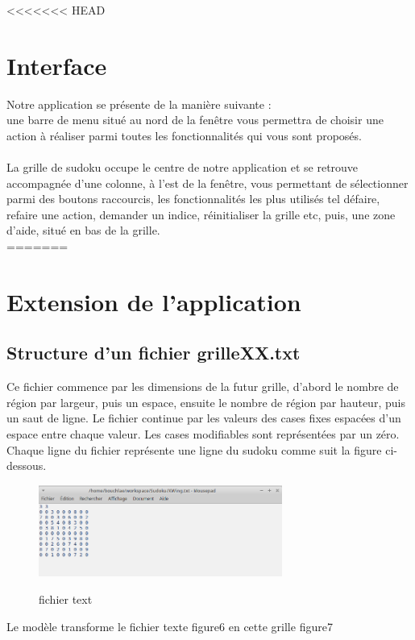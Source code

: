\newpage
<<<<<<< HEAD
\section{Interface}

Notre application se présente de la manière suivante :\\
une barre de menu situé au nord de la fenêtre vous permettra de choisir 
une action à réaliser parmi toutes les fonctionnalités qui vous sont proposés.\\
\\
La grille de sudoku occupe le centre de notre application et se retrouve accompagnée 
d'une colonne, à l'est de la fenêtre, vous permettant de sélectionner 
parmi des boutons raccourcis, les fonctionnalités les plus utilisés tel défaire, 
refaire une action, demander un indice, réinitialiser la grille etc, puis, 
une zone d'aide, situé en bas de la grille.\\
=======
\section{Extension de l’application}
\subsection{Structure d'un fichier grilleXX.txt}
Ce fichier commence  par les dimensions de la futur grille, d’abord le nombre de région par 
largeur, puis un espace, ensuite le nombre de région par hauteur, puis un saut de ligne.
Le fichier continue par les valeurs des cases fixes espacées d’un espace entre chaque valeur. 
Les cases modifiables sont représentées par un zéro. Chaque ligne du fichier représente une 
ligne du sudoku comme suit la figure ci-dessous.
\begin{figure}[ht]
  \caption{\label{annexe1} fichier text}
  \includegraphics [width=80mm]{images/Fichier_text.png} \\[0.5cm]
\end{figure}

Le modèle transforme le fichier texte figure6 en cette grille figure7\\

